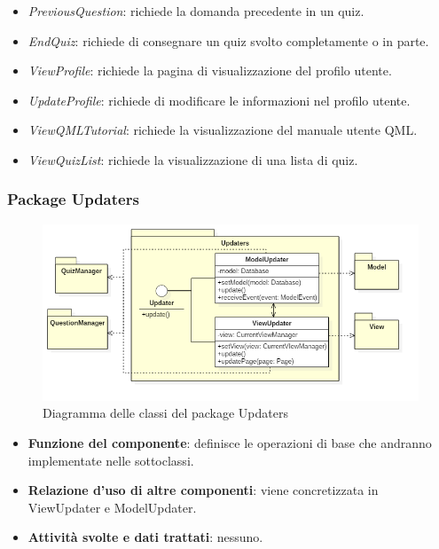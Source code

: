 \begin{itemize}
\begin{itemize}
	\item\textit{PreviousQuestion}: richiede la domanda precedente in un quiz.
	\item\textit{EndQuiz}: richiede di consegnare un quiz svolto completamente o in parte.
	\item\textit{ViewProfile}: richiede la pagina di visualizzazione del profilo utente.
	\item\textit{UpdateProfile}: richiede di modificare le informazioni nel profilo utente.
	\item\textit{ViewQMLTutorial}: richiede la visualizzazione del manuale utente QML.
	\item\textit{ViewQuizList}: richiede la visualizzazione di una lista di quiz.
	\end{itemize}
\end{itemize}

			\subsubsection{Package Updaters}
\begin{figure}[h!]
\begin{center}
	\includegraphics[scale=0.65]{../images/UpdatersClass.png}
	\caption{Diagramma delle classi del package Updaters}
\end{center}
\end{figure}
\begin{itemize}
	\item\textbf{Funzione del componente}: definisce le operazioni di base che andranno implementate nelle sottoclassi.
	\item\textbf{Relazione d'uso di altre componenti}: viene concretizzata in ViewUpdater e ModelUpdater.
	\item\textbf{Attività svolte e dati trattati}: nessuno.
\end{itemize}

